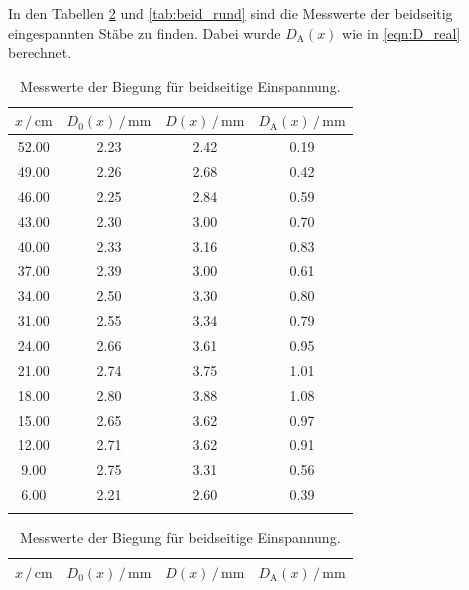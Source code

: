 In den Tabellen \ref{tab:beid_eckig} und \ref{tab:beid_rund} sind die Messwerte der beidseitig eingespannten Stäbe zu finden.
Dabei wurde $D_\text{A}(x)$ wie in \eqref{eqn:D_real} berechnet.

\begin{table}
\centering
\caption{Messwerte der Biegung für beidseitige Einspannung.}
\begin{tabular}[t]{cccc}
    \toprule
    $x\,/\,\si{\centi\meter}$ & $D_0(x) \,/\, \si{\milli\meter}$ & $D(x) \,/\, \si{\milli\meter}$ & $D_\text{A}(x) \,/\, \si{\milli\meter}$\\
    \midrule
    52.00 & 2.23 & 2.42 & 0.19 \\
    49.00 & 2.26 & 2.68 & 0.42 \\
    46.00 & 2.25 & 2.84 & 0.59 \\
    43.00 & 2.30 & 3.00 & 0.70 \\
    40.00 & 2.33 & 3.16 & 0.83 \\
    37.00 & 2.39 & 3.00 & 0.61 \\
    34.00 & 2.50 & 3.30 & 0.80 \\
    31.00 & 2.55 & 3.34 & 0.79 \\
    24.00 & 2.66 & 3.61 & 0.95 \\
    21.00 & 2.74 & 3.75 & 1.01 \\
    18.00 & 2.80 & 3.88 & 1.08 \\
    15.00 & 2.65 & 3.62 & 0.97 \\
    12.00 & 2.71 & 3.62 & 0.91 \\
    9.00 & 2.75 & 3.31 & 0.56 \\
    6.00 & 2.21 & 2.60 & 0.39 \\
    \bottomrule
    
    \label{tab:beid_eckig}
\end{tabular}
\begin{tabular}[t]{cccc}
    \toprule
    $x\,/\,\si{\centi\meter}$ & $D_0(x) \,/\, \si{\milli\meter}$ & $D(x) \,/\, \si{\milli\meter}$ & $D_\text{A}(x) \,/\, \si{\milli\meter}$\\
    \midrule
    

\end{tabular}
\end{table}
